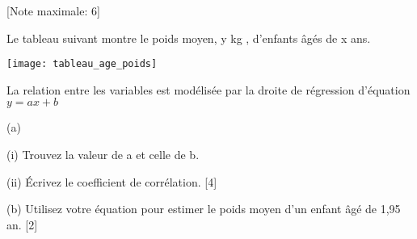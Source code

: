 \begin{question}
  \hspace*{\fill} [Note maximale: 6]\par
  \noindent Le tableau suivant montre le poids moyen, y kg , d’enfants âgés de x ans.\par
  \medskip
  \texttt{[image: tableau\_age\_poids]}\par
  \noindent La relation entre les variables est modélisée par la droite de régression d’équation $y = ax + b$\par
  (a)\par
  \medskip
  \hspace{1em}(i)  Trouvez la valeur de a et celle de b.\par
  \medskip
  \hspace{1em}(ii) Écrivez le coefficient de corrélation.\hspace*{\fill} [4]\par
  \bigskip
  (b) Utilisez votre équation pour estimer le poids moyen d’un enfant âgé de 1,95 an.\hspace*{\fill} [2]\par
  
\end{question}

